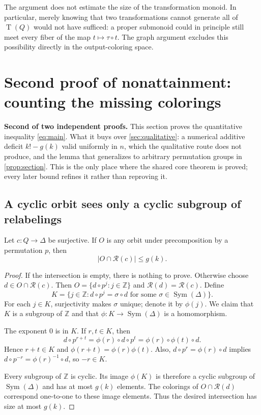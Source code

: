 \documentclass[11pt,a4paper]{article}
\numberwithin{equation}{section}
\theoremstyle{definition}
\theoremstyle{remark}
\newcommand{\Z}{\mathbb Z}
\newcommand{\D}{\Delta}
\newcommand{\Sym}{\operatorname{Sym}}
\newcommand{\TQ}{\operatorname{T}(Q)}
\begin{document}
The argument does not estimate the size of the transformation monoid. In
particular, merely knowing that two transformations cannot generate all of
$\TQ$ would not have sufficed: a proper submonoid could in principle still
meet every fiber of the map $t\mapsto\tau\circ t$. The graph argument
excludes this possibility directly in the output-coloring space.

\section{Second proof of nonattainment: counting the missing
colorings}\label{sec:quantitative}

\begin{resultbox}
\textbf{Second of two independent proofs.} This section proves the
quantitative inequality \eqref{eq:main}. What it buys over
\cref{sec:qualitative}: a numerical additive deficit $k!-g(k)$ valid
uniformly in $n$, which the qualitative route does not produce, and the
lemma that generalizes to arbitrary permutation groups in
\cref{prop:section}. This is the only place where the shared core theorem is
proved; every later bound refines it rather than reproving it.
\end{resultbox}

\subsection{A cyclic orbit sees only a cyclic subgroup of relabelings}

\begin{lemma}\label{lem:intersection}
Let $c:Q\to\D$ be surjective. If $O$ is any orbit under precomposition by a
permutation $p$, then
\[
 |O\cap\mathcal R(c)|\le g(k).
\]
\end{lemma}
\begin{proof}
If the intersection is empty, there is nothing to prove. Otherwise choose
$d\in O\cap\mathcal R(c)$. Then $O=\{d\circ p^j:j\in\Z\}$ and
$\mathcal R(d)=\mathcal R(c)$. Define
\[
 K=\{j\in\Z:d\circ p^j=\sigma\circ d
       \text{ for some }\sigma\in\Sym(\D)\}.
\]
For each $j\in K$, surjectivity makes $\sigma$ unique; denote it by
$\phi(j)$. We claim that $K$ is a subgroup of $\Z$ and that
$\phi:K\to\Sym(\D)$ is a homomorphism.

The exponent $0$ is in $K$. If $r,t\in K$, then
\[
 d\circ p^{r+t}
 =\phi(r)\circ d\circ p^t
 =\phi(r)\circ\phi(t)\circ d.
\]
Hence $r+t\in K$ and $\phi(r+t)=\phi(r)\phi(t)$. Also,
$d\circ p^r=\phi(r)\circ d$ implies
$d\circ p^{-r}=\phi(r)^{-1}\circ d$, so $-r\in K$.

Every subgroup of $\Z$ is cyclic. Its image $\phi(K)$ is therefore a cyclic
subgroup of $\Sym(\D)$ and has at most $g(k)$ elements. The colorings of
$O\cap\mathcal R(d)$ correspond one-to-one to these image elements. Thus
the desired intersection has size at most $g(k)$.
\end{proof}
\end{document}

